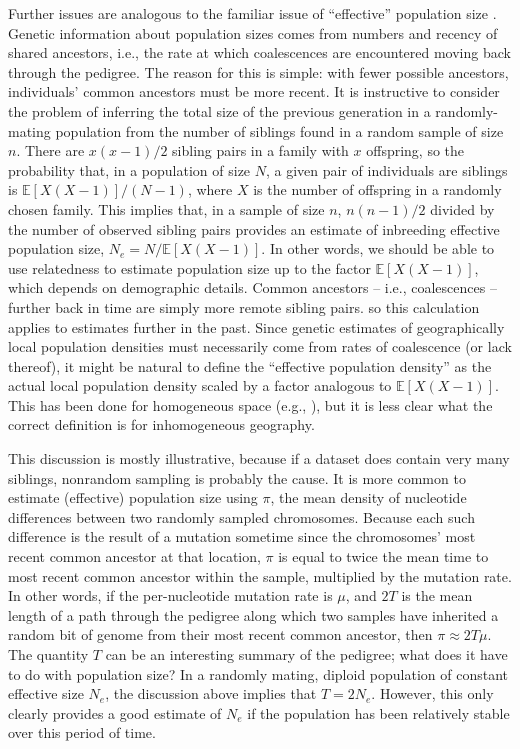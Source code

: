 \documentclass{ar-1col}
\newcommand{\E}{\mathbb{E}}
\begin{document}
Further issues are analogous to the familiar
issue of ``effective'' population size \citep{CharlesworthCharlesworthBarton2003}.
Genetic information about population sizes
comes from numbers and recency of shared ancestors, 
i.e., the rate at which coalescences are encountered moving back through the pedigree.
The reason for this is simple:
with fewer possible ancestors,
individuals' common ancestors must be more recent.
It is instructive to consider 
the problem of inferring the total size of the previous generation
in a randomly-mating population
from the number of siblings found in a random sample of size $n$.
There are $x (x-1) / 2$ sibling pairs in a family with $x$ offspring,
so the probability that, 
in a population of size $N$, 
a given pair of individuals are siblings
is $\E[X (X-1)] / (N-1)$, where $X$ is the number of offspring in a randomly chosen family.
This implies that, 
in a sample of size $n$,
$n(n-1)/2$ divided by the number of observed sibling pairs 
provides an estimate of inbreeding effective population size, $N_e = N/\E[X(X-1)]$.
In other words, we should be able to use relatedness to estimate population size
up to the factor $\E[X(X-1)]$, which depends on demographic details.
Common ancestors -- i.e., coalescences --
further back in time are simply more remote sibling pairs.
so this calculation applies to estimates further in the past.
Since genetic estimates of geographically local population densities
must necessarily come from rates of coalescence (or lack thereof),
it might be natural to define the ``effective population density''
as the actual local population density scaled by a factor analogous to $\E[X(X-1)]$.
This has been done for homogeneous space (e.g., \citep{barton-depaulis-etheridge}),
but it is less clear what the correct definition is for inhomogeneous geography.

This discussion is mostly illustrative, because
if a dataset does contain very many siblings,
nonrandom sampling is probably the cause.
It is more common to estimate (effective) population size
using $\pi$,
the mean density of nucleotide differences between two randomly sampled chromosomes.
Because each such difference is the result of a mutation
sometime since the chromosomes' most recent common ancestor at that location,
$\pi$ is equal to twice the mean time to most recent common ancestor
within the sample, multiplied by the mutation rate.
In other words, if the per-nucleotide mutation rate is $\mu$,
and $2T$ is the mean length of a path through the pedigree
along which two samples have inherited a random bit of genome
from their most recent common ancestor,
then $\pi \approx 2 T \mu$.
The quantity $T$ can be an interesting summary of the pedigree;
what does it have to do with population size?
In a randomly mating, diploid population of constant effective size $N_e$,
the discussion above implies that $T = 2N_e$.
However, this only clearly provides a good estimate of $N_e$
if the population has been relatively stable over this period of time.
\end{document}
